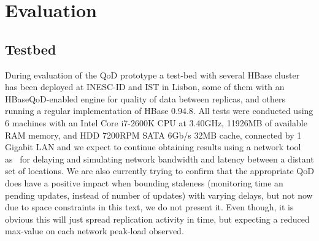 
%
%


\chapter{Evaluation}
\label{ch:evaluation}

%




\section{Testbed}
During evaluation of the QoD prototype a test-bed with several HBase cluster has been deployed at INESC-ID and IST in Lisbon, some of them with an HBaseQoD-enabled engine for quality of data between replicas, and others running a regular implementation of HBase 0.94.8. All tests were conducted using 6 machines with an Intel Core i7-2600K CPU at 3.40GHz, 11926MB of available RAM memory, and HDD 7200RPM SATA 6Gb/s 32MB cache, connected by 1 Gigabit LAN and we expect to continue obtaining results using a network tool as~\cite{netem:2005} for delaying and simulating network bandwidth and latency between a distant set of locations. We are also currently trying to confirm that the appropriate QoD does have a positive impact when bounding staleness (monitoring time an pending updates, instead of number of updates) with varying delays, but not now due to space constraints in this text, we do not present it. Even though, it is obvious this will just spread replication activity in time, but expecting a reduced max-value on each network peak-load observed.


